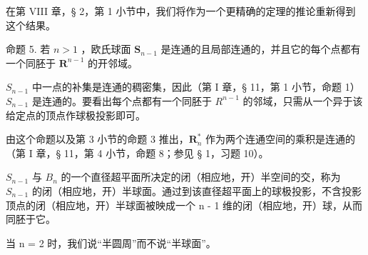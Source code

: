 在第 VIII 章，§ 2，第 1 小节中，我们将作为一个更精确的定理的推论重新得到这个结果。

命题 5. 若 \(n > 1\) ，欧氏球面 \(\mathbf{S}_{n-1}\) 是连通的且局部连通的，并且它的每个点都有一个同胚于 \(\mathbf{R}^{n-1}\) 的开邻域。

\(S_{n-1}\) 中一点的补集是连通的稠密集，因此（第 I 章，§ 11，第 1 小节，命题 1）\(S_{n-1}\) 是连通的。要看出每个点都有一个同胚于 \(R^{n-1}\) 的邻域，只需从一个异于该给定点的顶点作球极投影即可。

由这个命题以及第 3 小节的命题 3 推出，\(\mathbf{R}_n^*\) 作为两个连通空间的乘积是连通的（第 I 章，§ 11，第 4 小节，命题 8；参见 § 1，习题 10）。

\(S_{n-1}\) 与 \(B_{n}\) 的一个直径超平面所决定的闭（相应地，开）半空间的交，称为 \(S_{n-1}\) 的闭（相应地，开）半球面。通过到该直径超平面上的球极投影，不含投影顶点的闭（相应地，开）半球面被映成一个 n - 1 维的闭（相应地，开）球，从而同胚于它。

当 n = 2 时，我们说“半圆周”而不说“半球面”。

